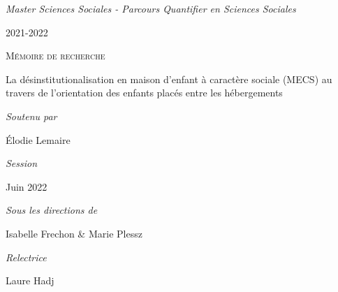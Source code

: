 \documentclass[
  12pt,
]{article}
\author{}
\date{\vspace{-2.5em}}
\begin{document}
\begin{titlepage}

\par
{}
\hfill
{}
\par


\vspace{1cm}
\begin{center}

\normalsize{\textit{Master Sciences Sociales - Parcours Quantifier en Sciences Sociales}}

2021-2022

\vspace{5mm}

\textsc{Mémoire de recherche}

\vfill 

{\Large La désinstitutionalisation en maison d’enfant à caractère sociale (MECS) au travers de l’orientation des enfants placés entre les hébergements\par}

\vfill

{\large\itshape Soutenu par}

{\large Élodie Lemaire}

\vspace{5mm}

\textit{Session}

Juin 2022

\vspace{5mm}

\textit{Sous les directions de}

Isabelle Frechon \& Marie Plessz

\vspace{5mm}

\textit{Relectrice}

Laure Hadj

\end{center}
\end{titlepage}
\newpage
\end{document}
